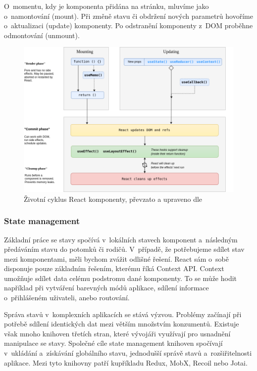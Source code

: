 O~momentu, kdy je komponenta přidána na stránku, mluvíme jako o~namontování (mount). Při změně stavu či obdržení nových parametrů hovoříme o~aktualizaci (update) komponenty. 
Po odstranění komponenty z~DOM proběhne odmontování (unmount).\cite{reactlifecycle, react}

\begin{figure}[htb]
	\centering
		\includegraphics[width=1\textwidth]{images/reactlifecycle.png}
	\caption[Životní cyklus React komponenty]{Životní cyklus React komponenty, převzato a upraveno dle \cite{reactlifecyclediagram}}
	\label{fig:reactlifecycle}
\end{figure}

\subsubsection{State management}

Základní práce se stavy spočívá v~lokálních stavech komponent a~následným předáváním stavu do potomků či rodičů. 
V~případě, že potřebujeme sdílet stav mezi komponentami, měli bychom zvážit odlišné řešení. React sám o~sobě disponuje pouze základním řešením, kterému říká Context API. 
Context umožňuje sdílet data celému podstromu dané komponenty. 
To se může hodit například při vytváření barevných módů aplikace, sdílení informace o~přihlášeném uživateli, anebo routování.\cite{react}

Správa stavů v~komplexních aplikacích se stává výzvou. Problémy začínají při potřebě sdílení identických dat mezi větším množstvím konzumentů. 
Existuje však mnoho knihoven třetích stran, které vývojáři využívají pro usnadnění manipulace se stavy. 
Společné cíle state management knihoven spočívají v~ukládání a~získávání globálního stavu, jednodušší správě stavů a~rozšiřitelnosti aplikace.
Mezi tyto knihovny patří kupříkladu Redux, MobX, Recoil nebo Jotai.\cite{statemanagementreact,reactstatemanagement}

